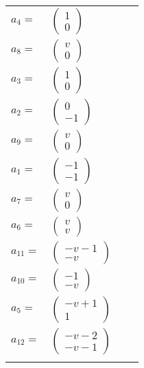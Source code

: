 \documentclass[1p]{elsarticle_modified}
\theoremstyle{definition}
\begin{document}
\begin{tabular}{m{7pt} m{180pt} m{7pt} m{180pt} }
\flushright $a_{4}=$&$\begin{pmatrix}1\\0\end{pmatrix}$ \\
\flushright $a_{8}=$&$\begin{pmatrix}v\\0\end{pmatrix}$ \\
\flushright $a_{3}=$&$\begin{pmatrix}1\\0\end{pmatrix}$ \\
\flushright $a_{2}=$&$\begin{pmatrix}0\\-1\end{pmatrix}$ \\
\flushright $a_{9}=$&$\begin{pmatrix}v\\0\end{pmatrix}$ \\
\flushright $a_{1}=$&$\begin{pmatrix}-1\\-1\end{pmatrix}$ \\
\flushright $a_{7}=$&$\begin{pmatrix}v\\0\end{pmatrix}$ \\
\flushright $a_{6}=$&$\begin{pmatrix}v\\v\end{pmatrix}$ \\
\flushright $a_{11}=$&$\begin{pmatrix}- v-1\\- v\end{pmatrix}$ \\
\flushright $a_{10}=$&$\begin{pmatrix}-1\\- v\end{pmatrix}$ \\
\flushright $a_{5}=$&$\begin{pmatrix}- v+1\\1\end{pmatrix}$ \\
\flushright $a_{12}=$&$\begin{pmatrix}- v-2\\- v-1\end{pmatrix}$\\&\end{tabular}
\end{document}
